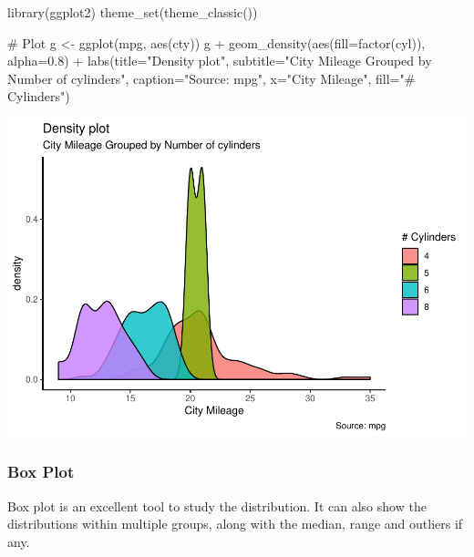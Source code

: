 \documentclass[a4paper]{article}
\newenvironment{Shaded}{}{}
\newcommand{\KeywordTok}[1]{\textcolor[rgb]{0.00,0.00,1.00}{#1}}
\newcommand{\DataTypeTok}[1]{#1}
\newcommand{\FloatTok}[1]{#1}
\newcommand{\StringTok}[1]{\textcolor[rgb]{0.00,0.50,0.50}{#1}}
\newcommand{\CommentTok}[1]{\textcolor[rgb]{0.00,0.50,0.00}{#1}}
\newcommand{\OperatorTok}[1]{#1}
\newcommand{\NormalTok}[1]{#1}
\begin{document}
\begin{Shaded}
\begin{Highlighting}[]
\KeywordTok{library}\NormalTok{(ggplot2)}
\KeywordTok{theme_set}\NormalTok{(}\KeywordTok{theme_classic}\NormalTok{())}

\CommentTok{# Plot}
\NormalTok{g <-}\StringTok{ }\KeywordTok{ggplot}\NormalTok{(mpg, }\KeywordTok{aes}\NormalTok{(cty))}
\NormalTok{g }\OperatorTok{+}\StringTok{ }\KeywordTok{geom_density}\NormalTok{(}\KeywordTok{aes}\NormalTok{(}\DataTypeTok{fill=}\KeywordTok{factor}\NormalTok{(cyl)), }\DataTypeTok{alpha=}\FloatTok{0.8}\NormalTok{) }\OperatorTok{+}\StringTok{ }
\StringTok{    }\KeywordTok{labs}\NormalTok{(}\DataTypeTok{title=}\StringTok{"Density plot"}\NormalTok{, }
         \DataTypeTok{subtitle=}\StringTok{"City Mileage Grouped by Number of cylinders"}\NormalTok{,}
         \DataTypeTok{caption=}\StringTok{"Source: mpg"}\NormalTok{,}
         \DataTypeTok{x=}\StringTok{"City Mileage"}\NormalTok{,}
         \DataTypeTok{fill=}\StringTok{"# Cylinders"}\NormalTok{)}
\end{Highlighting}
\end{Shaded}

\includegraphics{M24-ggplot2_Gallery_files/figure-latex/unnamed-chunk-25-1.pdf}

\newpage

\subsubsection{Box Plot}\label{box-plot}

Box plot is an excellent tool to study the distribution. It can also
show the distributions within multiple groups, along with the median,
range and outliers if any.
\end{document}
